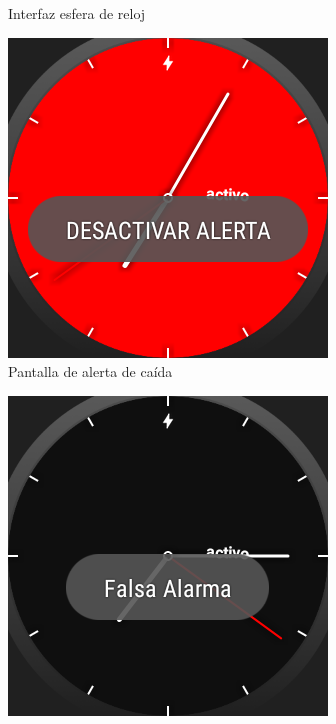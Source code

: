 \documentclass[11pt,a4paper,spanish,twocolumn]{article}
\begin{document}
\begin{figure}[!ht]
\begin{subfigure}[b]{0.48\columnwidth}
      \caption{\footnotesize Interfaz esfera de reloj}
      \label{fig:uiWatchface}
  \end{subfigure}
  \begin{subfigure}[b]{0.48\columnwidth}
      \centering
      \includegraphics[width=\linewidth]{img/appAlerta.png}
      \caption{\footnotesize Pantalla de alerta de caída}
      \label{fig:uiAlerta}
  \end{subfigure}
  \hfill
  \begin{subfigure}[b]{0.48\columnwidth}
      \centering
      \includegraphics[width=\linewidth]{img/appAlertaFalsa.png}

\end{subfigure}
\end{figure}
\end{document}
